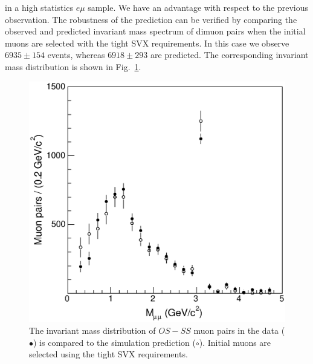 \documentclass[aps,prd,preprint,floatfix,nofootinbib,superscriptaddress,showpacs,amssymb]{revtex4}
\begin{document}
 in a high statistics $e \mu$ sample. We have an advantage with 
 respect to the previous observation. The robustness of the prediction
 can be verified by comparing the observed and predicted invariant
 mass spectrum of dimuon pairs when the initial muons are selected
 with the tight SVX requirements. In this case we observe $6935\pm 154$
 events, whereas $ 6918 \pm 293$ are predicted. The corresponding
 invariant mass distribution is shown in Fig.~\ref{fig:fig_9}.
 \begin{figure}
 \begin{center}
 \vspace{-0.3in}
 \leavevmode
 \includegraphics*[width=\textwidth]{fa0_9.eps}
 \caption[]{The invariant mass distribution of $OS-SS$ muon pairs in the
            data ($\bullet$) is compared to the simulation prediction
            ($\circ$). Initial muons are selected using the
            tight SVX requirements.}
 \label{fig:fig_9}
 \end{center}
 \end{figure}
\end{document}
